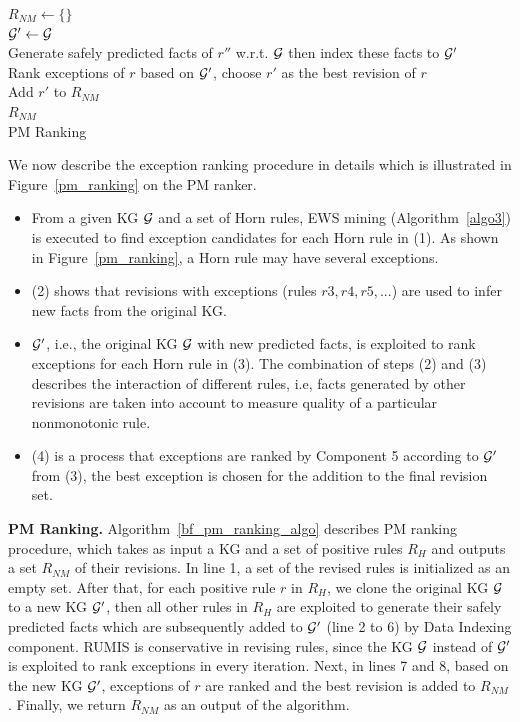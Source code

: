 \IncMargin{1.5em}
\begin{algorithm}[h]
\DontPrintSemicolon
\SetAlgoLined
{}
\BlankLine
$R_{NM} \leftarrow \{\}$\\
\BlankLine
{} {
	$\mathcal{G}' \leftarrow \mathcal{G}$\\
	 {
		Generate safely predicted facts of $r''$ w.r.t. $\mathcal{G}$ then index these facts to $\mathcal{G}'$\\
	}
	Rank exceptions of $r$ based on $\mathcal{G}'$, choose $r'$ as the best revision of $r$\\
	Add $r'$ to $R_{NM}$\\
}
\Return $R_{NM}$\\
\caption{PM Ranking}
\label{bf_pm_ranking_algo}
\end{algorithm}
\DecMargin{1.5em}

We now describe the exception ranking procedure in details which is illustrated in Figure~\ref{pm_ranking} on the PM ranker.

\begin{itemize}
\item From a given KG $\mathcal{G}$ and a set of Horn rules, EWS mining (Algorithm~\ref{algo3}) is executed to find exception candidates for each Horn rule in (1). As shown in Figure~\ref{pm_ranking}, a Horn rule may have several exceptions.
\item (2) shows that revisions with exceptions (rules $r3, r4, r5, ...$) are used to infer new facts from the original KG.
\item $\mathcal{G}'$, i.e., the original KG $\mathcal{G}$ with new predicted facts, is exploited to rank exceptions for each Horn rule in (3). The combination of steps (2) and (3) describes the interaction of different rules, i.e, facts generated by other revisions are taken into account to measure quality of a particular nonmonotonic rule.
\item (4) is a process that exceptions are ranked by Component 5 according to $\mathcal{G}'$ from (3), the best exception is chosen for the addition to the final revision set.
\end{itemize}

\textbf{PM Ranking.} Algorithm~\ref{bf_pm_ranking_algo} describes PM ranking procedure, which takes as input a KG and a set of positive rules $R_H$ and outputs a set $R_{NM}$ of their revisions. In line 1, a set of the revised rules is initialized as an empty set. After that, for each positive rule $r$ in $R_H$, we clone the original KG $\mathcal{G}$ to a new KG $\mathcal{G}'$, then all other rules in $R_H$ are exploited to generate their safely predicted facts which are subsequently added to $\mathcal{G}'$ (line 2 to 6) by Data Indexing component. RUMIS is conservative in revising rules, since the KG $\mathcal{G}$ instead of $\mathcal{G}'$ is exploited to rank exceptions in every iteration. Next, in lines 7 and 8, based on the new KG $\mathcal{G}'$, exceptions of $r$ are ranked and the best revision is added to $R_{NM}$. Finally, we return $R_{NM}$ as an output of the algorithm.

